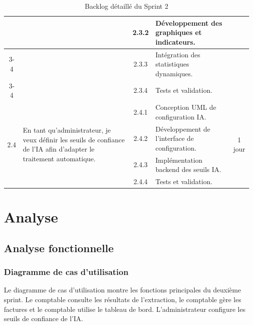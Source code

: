 \begin{table}[H]
\begin{tabularx}{\textwidth}{|c|p{3.6cm}|c|X|c|}
		& & 2.3.2 & Développement des graphiques et indicateurs.
		& \\ \cline{3-4}
		
		& & 2.3.3 & Intégration des statistiques dynamiques.
		& \\ \cline{3-4}
		
		& & 2.3.4 & Tests et validation.
		& \\ \hline
		
		
		\multirow{4}{*}{2.4}
		& \multirow{4}{3.6cm}{
			En tant qu’administrateur, je veux définir les seuils de confiance de l’IA afin d’adapter le traitement automatique.
		}
		& 2.4.1 & Conception UML de configuration IA. & \multirow{4}{*}{1 jour}
		\\ \cline{3-4}
		
		& & 2.4.2 & Développement de l’interface de configuration.
		& \\ \cline{3-4}
		
		& & 2.4.3 & Implémentation backend des seuils IA.
		& \\ \cline{3-4}
		
		& & 2.4.4 & Tests et validation.
		& \\ \hline
		
	\end{tabularx}
	
	\caption{Backlog détaillé du Sprint 2}
	\label{tab:backlog_sprint2}
	
\end{table}

\FloatBarrier


\section{Analyse}

\subsection{Analyse fonctionnelle}

\subsubsection{Diagramme de cas d’utilisation}

Le diagramme de cas d’utilisation montre les fonctions principales du deuxième sprint. Le comptable consulte les résultats de l’extraction, le comptable gère les factures et le comptable utilise le tableau de bord. L’administrateur configure les seuils de confiance de l’IA.

